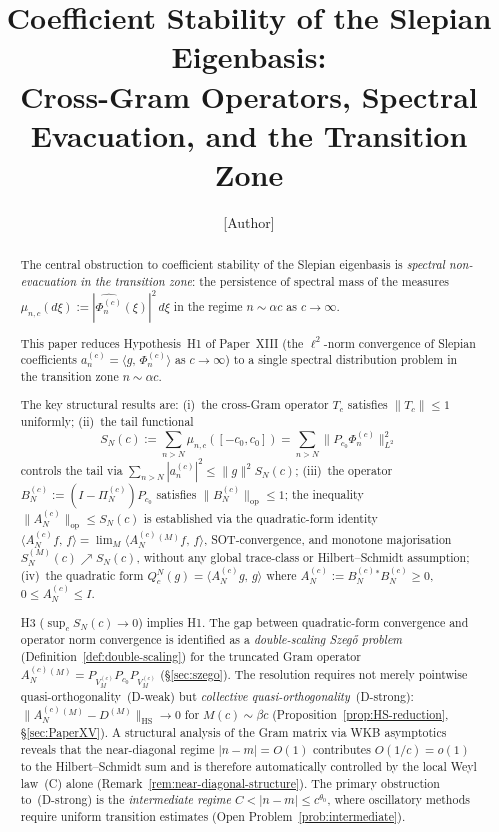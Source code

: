 \documentclass[12pt,a4paper]{amsart}
\theoremstyle{definition}
\theoremstyle{remark}
\newcommand{\norm}[1]{\|#1\|}
\newcommand{\ip}[2]{\langle #1,\, #2\rangle}
\newcommand{\Phic}[2]{\Phi_{#2}^{(#1)}}
\newcommand{\Pc}{P_{c_0}}
\newcommand{\Bn}{B_N^{(c)}}
\newcommand{\Ac}{A_N^{(c)}}
\begin{document}
\title[Coefficient Stability of the Slepian Eigenbasis]{%
  Coefficient Stability of the Slepian Eigenbasis:\\
  Cross-Gram Operators, Spectral Evacuation, and the Transition Zone}

\author{[Author]}
\address{[Address]}
\email{[Email]}

\begin{abstract}
The central obstruction to coefficient stability
of the Slepian eigenbasis is
\emph{spectral non-evacuation in the transition
zone}: the persistence of spectral mass of the
measures $\mu_{n,c}(d\xi)
:=|\widehat{\Phi_n^{(c)}}(\xi)|^2\,d\xi$
in the regime $n\sim\alpha c$ as $c\to\infty$.

This paper reduces Hypothesis~H1 of Paper~XIII
(the $\ell^2$-norm convergence of Slepian
coefficients $a_n^{(c)}=\ip{g}{\Phic{c}{n}}$
as $c\to\infty$) to a single spectral
distribution problem in the transition
zone $n\sim\alpha c$.

The key structural results are:
(i)~the cross-Gram operator $T_c$ satisfies
$\norm{T_c}\le 1$ uniformly;
(ii)~the tail functional
\[
  S_N(c) := \sum_{n>N}\mu_{n,c}([-c_0,c_0])
  = \sum_{n>N}\norm{\Pc\Phic{c}{n}}^2_{L^2}
\]
controls the tail via
$\sum_{n>N}|a_n^{(c)}|^2\le\norm{g}^2 S_N(c)$;
(iii)~the operator $\Bn:=(I-\Pi_N^{(c)})\Pc$
satisfies $\norm{\Bn}_{\mathrm{op}}\le 1$;
the inequality $\norm{\Ac}_{\mathrm{op}}\le S_N(c)$
is established via the quadratic-form identity
$\ip{\Ac f}{f}=\lim_M\ip{\Ac^{(M)}f}{f}$,
SOT-convergence, and monotone majorisation
$S_N^{(M)}(c)\nearrow S_N(c)$,
without any global trace-class or
Hilbert--Schmidt assumption;
(iv)~the quadratic form
$Q_c^N(g)=\ip{\Ac g}{g}$
where $\Ac:=\Bn^*\Bn\ge 0$, $0\le\Ac\le I$.

H3 ($\sup_c S_N(c)\to 0$) implies H1.
The gap between quadratic-form convergence
and operator norm convergence is identified
as a \emph{double-scaling Szeg\H{o} problem}
(Definition~\ref{def:double-scaling})
for the truncated Gram operator
$\Ac^{(M)}=P_{V_M^{(c)}}P_{c_0}P_{V_M^{(c)}}$
(\S\ref{sec:szego}).
The resolution requires not merely
pointwise quasi-orthogonality~(D-weak)
but \emph{collective quasi-orthogonality}~(D-strong):
$\|\Ac^{(M)}-D^{(M)}\|_{\mathrm{HS}}\to 0$
for $M(c)\sim\beta c$
(Proposition~\ref{prop:HS-reduction},
\S\ref{sec:PaperXV}).
A structural analysis of the Gram matrix
via WKB asymptotics reveals that the
near-diagonal regime $|n-m|=O(1)$
contributes $O(1/c)=o(1)$ to the
Hilbert--Schmidt sum and is therefore
automatically controlled by the local
Weyl law~(C) alone
(Remark~\ref{rem:near-diagonal-structure}).
The primary obstruction to~(D-strong)
is the \emph{intermediate regime}
$C<|n-m|\le c^{\theta_0}$, where
oscillatory methods require uniform
transition estimates
(Open Problem~\ref{prob:intermediate}).
\end{abstract}
\end{document}
